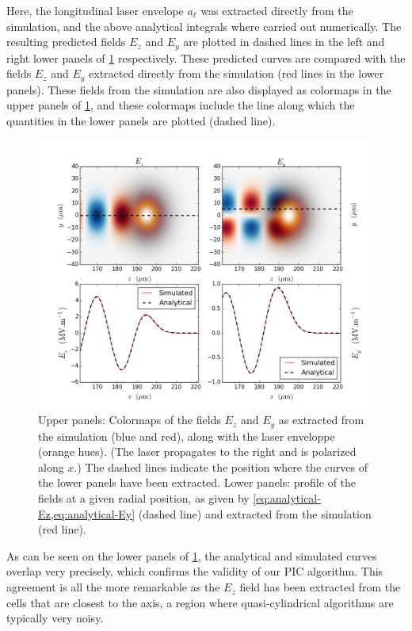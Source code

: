 \documentclass[1p,times,authoryear]{elsarticle}
\begin{document}
Here, the longitudinal laser envelope $a_\ell$ was extracted directly from the
simulation, and the above analytical integrals where carried out
numerically. The resulting predicted fields $E_z$ and $E_y$ are plotted in dashed lines
in the left and right lower panels of \cref{fig:Linear_wkfld}
respectively. These predicted curves are compared with
the fields $E_z$ and $E_y$ extracted directly from the simulation (red
lines in the lower panels). These fields from the simulation are also
displayed as colormaps in the upper panels of \cref{fig:Linear_wkfld},
and these colormaps include the line along which the quantities in the
lower panels are plotted (dashed line).

\begin{figure}[!h]
\centering
\includegraphics[width=\textwidth]{figures/Linear_wkfld.png}
\caption{\label{fig:Linear_wkfld}Upper panels: Colormaps of the fields $E_z$ and
  $E_y$ as extracted from the simulation (blue and red), along with
  the laser enveloppe (orange hues). (The laser propagates to the
  right and is polarized along $x$.) The dashed lines indicate the
  position where the curves of the lower panels have been extracted. 
Lower panels: profile of the fields at a given radial
position, as given by \cref{eq:analytical-Ez,eq:analytical-Ey} (dashed
line) and extracted from the simulation (red line).}
\end{figure}

As can be seen on the lower panels of \cref{fig:Linear_wkfld}, the
analytical and simulated curves overlap very precisely, which confirms
the validity of our PIC algorithm. This agreement is all
the more remarkable as the $E_z$ field has been extracted from the cells
that are closest to the axis, a region where quasi-cylindrical algorithms
are typically very noisy.
\end{document}
